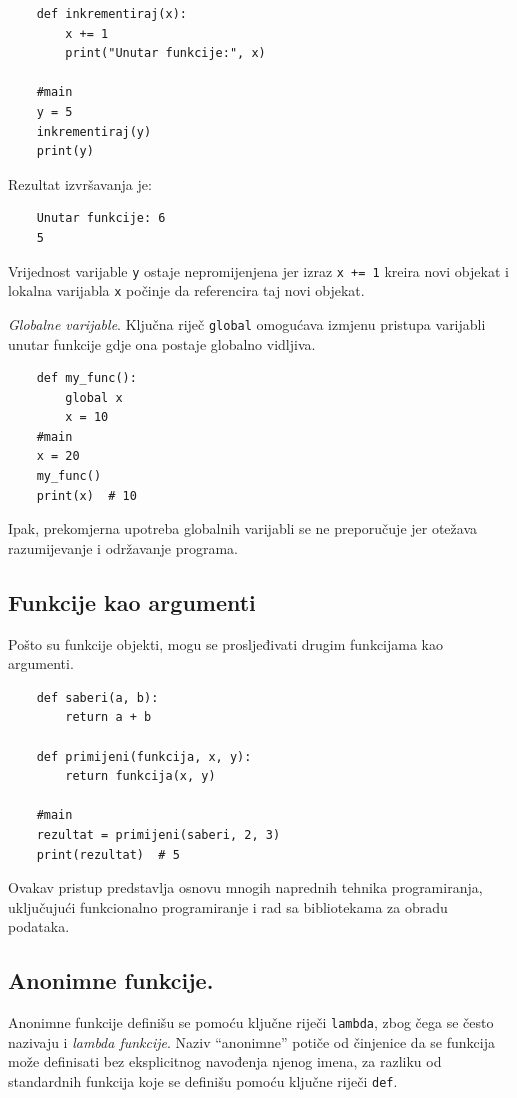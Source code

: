 \begin{verbatim}
	def inkrementiraj(x):
	    x += 1
	    print("Unutar funkcije:", x)
	
	#main
	y = 5	
	inkrementiraj(y)
	print(y)
\end{verbatim}

Rezultat izvršavanja je:
\begin{verbatim}
	Unutar funkcije: 6
	5
\end{verbatim}

Vrijednost varijable \texttt{y} ostaje nepromijenjena jer izraz \texttt{x += 1} kreira novi objekat i lokalna varijabla \texttt{x} počinje da referencira taj novi objekat.

\textit{Globalne varijable}. Ključna riječ \texttt{global} omogućava izmjenu pristupa varijabli unutar funkcije gdje ona postaje globalno vidljiva. 

\begin{verbatim}
	def my_func():
	    global x
	    x = 10
	#main
	x = 20
	my_func()
	print(x)  # 10
\end{verbatim}
Ipak, prekomjerna upotreba globalnih varijabli se ne preporučuje jer otežava razumijevanje i održavanje programa.

\subsection{Funkcije kao argumenti}

Pošto su funkcije objekti, mogu se prosljeđivati drugim funkcijama kao argumenti.

\begin{verbatim}
	def saberi(a, b):
	    return a + b
	
	def primijeni(funkcija, x, y):
	    return funkcija(x, y)
	
	#main
	rezultat = primijeni(saberi, 2, 3)
	print(rezultat)  # 5
\end{verbatim}

Ovakav pristup predstavlja osnovu mnogih naprednih tehnika programiranja, uključujući funkcionalno programiranje i rad sa bibliotekama za obradu podataka.


\subsection{Anonimne funkcije.} 

Anonimne funkcije definišu se pomoću ključne riječi \texttt{lambda}, zbog čega se često nazivaju i \textit{lambda funkcije}. Naziv ``anonimne'' potiče od činjenice da se funkcija može definisati bez eksplicitnog navođenja njenog imena, za razliku od standardnih funkcija koje se definišu pomoću ključne riječi \texttt{def}.

